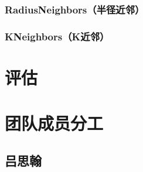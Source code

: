 \documentclass{ctexart}
\begin{document}
\subsubsection{RadiusNeighbors（半径近邻）}

\subsubsection{KNeighbors（K近邻）}







\section{评估}

\section{团队成员分工}

\subsection{吕思翰}
\end{document}
